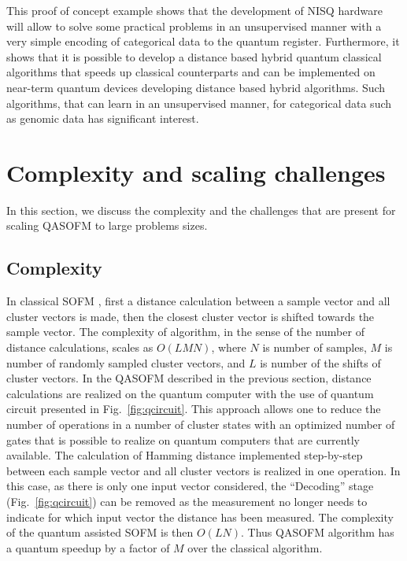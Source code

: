 \documentclass[pra,showkeys,twocolumn,showpacs,aps,10pt]{revtex4-2}
\begin{document}
This proof of concept example shows that the development of NISQ hardware will allow to solve some practical problems in an unsupervised manner with a very simple encoding of categorical data to the quantum register.
Furthermore, it shows that it is possible to develop a distance based hybrid quantum classical algorithms
that speeds up classical counterparts and can be implemented on near-term quantum devices
developing distance based hybrid algorithms. Such algorithms,
that can learn in an unsupervised manner, for categorical data such as genomic data has significant interest.



























\section{Complexity and scaling challenges}

In this section, we discuss the complexity and the challenges that are present for scaling QASOFM to large problems sizes.

\subsection{Complexity}

In classical SOFM \cite{kohonen1990}, first a distance calculation between a sample vector and all cluster vectors is made,
then the closest cluster vector is shifted towards the sample vector.
The complexity of algorithm, in the sense of the number of distance calculations, scales as $O(LMN)$,
where $N$ is number of samples,
$M$ is number of randomly sampled cluster vectors,
and $L$ is number of the shifts of cluster vectors.
In the QASOFM described in the previous section, distance calculations are realized on the quantum computer with the use of quantum circuit presented in Fig.~\ref{fig:qcircuit}. This approach allows one to reduce the number of operations in a number of cluster states with an optimized number of gates
that is possible to realize on quantum computers that are currently available.
The calculation of Hamming distance implemented step-by-step between each sample vector and all cluster vectors is realized in one operation. In this case, as there is only one input vector considered, the ``Decoding'' stage (Fig.~\ref{fig:qcircuit}) can be removed as the measurement no longer needs to indicate for which input vector the distance has been measured.
The complexity of the quantum assisted SOFM is then $O(LN)$.  Thus QASOFM algorithm has a quantum speedup by a factor of $ M $ over the classical algorithm.
\end{document}
